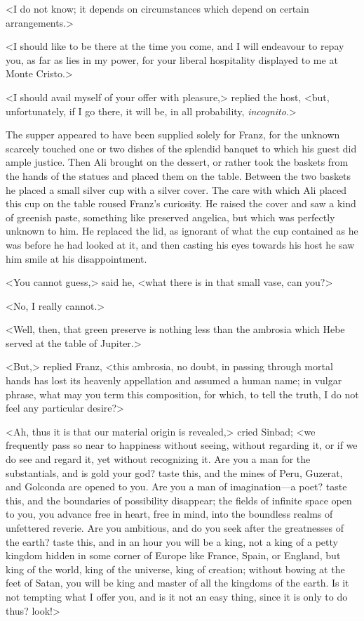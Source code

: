  <I do not know; it depends on circumstances which depend on certain arrangements.> 

 <I should like to be there at the time you come, and I will endeavour to repay you, as far as lies in my power, for your liberal hospitality displayed to me at Monte Cristo.> 

 <I should avail myself of your offer with pleasure,> replied the host, <but, unfortunately, if I go there, it will be, in all probability, \textit{incognito}.> 

 The supper appeared to have been supplied solely for Franz, for the unknown scarcely touched one or two dishes of the splendid banquet to which his guest did ample justice. Then Ali brought on the dessert, or rather took the baskets from the hands of the statues and placed them on the table. Between the two baskets he placed a small silver cup with a silver cover. The care with which Ali placed this cup on the table roused Franz's curiosity. He raised the cover and saw a kind of greenish paste, something like preserved angelica, but which was perfectly unknown to him. He replaced the lid, as ignorant of what the cup contained as he was before he had looked at it, and then casting his eyes towards his host he saw him smile at his disappointment. 

 <You cannot guess,> said he, <what there is in that small vase, can you?> 

 <No, I really cannot.> 

 <Well, then, that green preserve is nothing less than the ambrosia which Hebe served at the table of Jupiter.> 

 <But,> replied Franz, <this ambrosia, no doubt, in passing through mortal hands has lost its heavenly appellation and assumed a human name; in vulgar phrase, what may you term this composition, for which, to tell the truth, I do not feel any particular desire?> 

 <Ah, thus it is that our material origin is revealed,> cried Sinbad; <we frequently pass so near to happiness without seeing, without regarding it, or if we do see and regard it, yet without recognizing it. Are you a man for the substantials, and is gold your god? taste this, and the mines of Peru, Guzerat, and Golconda are opened to you. Are you a man of imagination—a poet? taste this, and the boundaries of possibility disappear; the fields of infinite space open to you, you advance free in heart, free in mind, into the boundless realms of unfettered reverie. Are you ambitious, and do you seek after the greatnesses of the earth? taste this, and in an hour you will be a king, not a king of a petty kingdom hidden in some corner of Europe like France, Spain, or England, but king of the world, king of the universe, king of creation; without bowing at the feet of Satan, you will be king and master of all the kingdoms of the earth. Is it not tempting what I offer you, and is it not an easy thing, since it is only to do thus? look!> 


